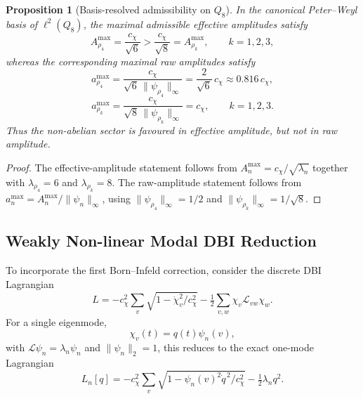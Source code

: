 \documentclass[11pt,a4paper]{article}
\newtheorem{proposition}{Proposition}
\begin{document}
    \begin{proposition}[Basis-resolved admissibility on $Q_8$]
      \label{prop:basis-resolved}
      In the canonical Peter--Weyl basis of $\ell^2(Q_8)$, the maximal admissible
      effective amplitudes satisfy
      \begin{equation}
        A_{\rho_4}^{\max}
        =
        \frac{c_\chi}{\sqrt{6}}
        >
        \frac{c_\chi}{\sqrt{8}}
        =
        A_{\rho_k}^{\max},
        \qquad
        k=1,2,3,
      \end{equation}
      whereas the corresponding maximal raw amplitudes satisfy
      \begin{equation}
        a_{\rho_4}^{\max}
        =
        \frac{c_\chi}{\sqrt{6}\,\|\psi_{\rho_4}\|_\infty}
        =
        \frac{2}{\sqrt{6}}\,c_\chi
        \approx 0.816\,c_\chi,
      \end{equation}
      \begin{equation}
        a_{\rho_k}^{\max}
        =
        \frac{c_\chi}{\sqrt{8}\,\|\psi_{\rho_k}\|_\infty}
        =
        c_\chi,
        \qquad
        k=1,2,3.
      \end{equation}
      Thus the non-abelian sector is favoured in effective amplitude, but not in raw
      amplitude.
    \end{proposition}

    \begin{proof}
      The effective-amplitude statement follows from
      $A_n^{\max} = c_\chi/\sqrt{\lambda_n}$ together with
      $\lambda_{\rho_4} = 6$ and $\lambda_{\rho_k} = 8$.
      The raw-amplitude statement follows from
      $a_n^{\max} = A_n^{\max}/\|\psi_n\|_\infty$, using
      $\|\psi_{\rho_4}\|_\infty = 1/2$ and
      $\|\psi_{\rho_k}\|_\infty = 1/\sqrt{8}$.
    \end{proof}

  \subsection{Weakly Non-linear Modal DBI Reduction}
    \label{subsec:weakly-nonlinear-dbi}

    To incorporate the first Born--Infeld correction, consider the discrete DBI Lagrangian
    \begin{equation}
      \label{eq:dbi-lagrangian}
      L
      =
      -c_\chi^2 \sum_v \sqrt{1 - \dot{\chi}_v^2/c_\chi^2}
      - \tfrac{1}{2} \sum_{v,w} \chi_v \mathcal{L}_{vw} \chi_w.
    \end{equation}
    For a single eigenmode,
    \begin{equation}
      \chi_v(t) = q(t)\psi_n(v),
    \end{equation}
    with $\mathcal{L}\psi_n = \lambda_n \psi_n$ and $\|\psi_n\|_2 = 1$, this reduces to
    the exact one-mode Lagrangian
    \begin{equation}
      \label{eq:exact-mode-lagrangian}
      L_n[q]
      =
      -c_\chi^2 \sum_v \sqrt{1 - \psi_n(v)^2 \dot{q}^{\,2}/c_\chi^2}
      - \tfrac{1}{2}\lambda_n q^2.
    \end{equation}
\end{document}
